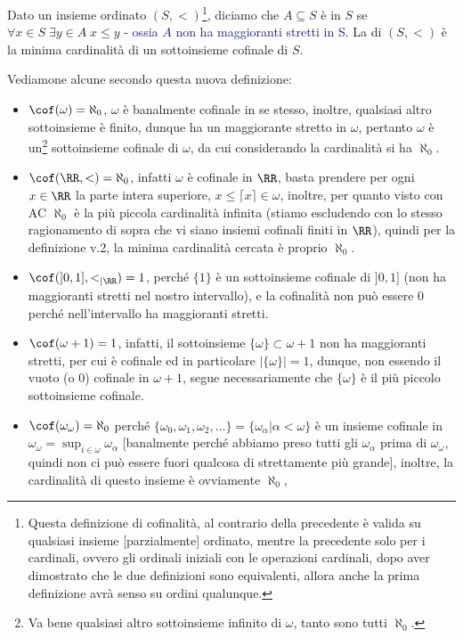 \documentclass[11pt]{scrartcl}
\begin{document}
\begin{definition}[Cofinalità - v.2]
	Dato un insieme ordinato $(S,<)$\footnote{Questa definizione di cofinalità, al contrario della precedente è valida su qualsiasi insieme [parzialmente] ordinato, mentre la
	precedente solo per i cardinali, ovvero gli ordinali iniziali con le operazioni cardinali, dopo aver dimostrato che le due definizioni sono equivalenti, allora anche la prima definizione
	avrà senso su ordini qualunque.}, diciamo che $A\subseteq S$ è  in $S$ se $\forall x \in S \; \exists y \in A \; x \leq y$ \textcolor{MidnightBlue}{- ossia $A$ non 
	ha maggioranti stretti in S}. La  di $(S,<)$ è la minima cardinalità di un sottoinsieme cofinale di $S$.
\end{definition}

\begin{example}
	Vediamone alcune secondo questa nuova definizione:
	\begin{itemize}
		\item $\cof(\omega) = \aleph_0$, $\omega$ è banalmente cofinale in se stesso, inoltre, qualsiasi altro sottoinsieme è finito, dunque ha un maggiorante stretto in $\omega$, pertanto $\omega$ è un\footnote{Va bene qualsiasi altro sottoinsieme infinito di $\omega$, tanto sono tutti $\aleph_0$.} sottoinsieme
		cofinale di $\omega$, da cui considerando la cardinalità si ha $\aleph_0$.
		\item $\cof(\RR,<) = \aleph_0$, infatti $\omega$ è cofinale in $\RR$, basta prendere per ogni $x \in \RR$ la parte intera superiore, $x \leq \lceil x \rceil \in \omega$, inoltre, per quanto visto con AC $\aleph_0$ è la più
		piccola cardinalità infinita (stiamo escludendo con lo stesso ragionamento di sopra che vi siano insiemi cofinali finiti in $\RR$), quindi per la definizione v.2, la minima cardinalità cercata è proprio $\aleph_0$.
		\item $\cof(]0,1],<_{|\RR}) = 1$, perché $\{1\}$ è un sottoinsieme cofinale di $]0,1]$ (non ha maggioranti stretti nel nostro intervallo), e la cofinalità non può essere 0 perché nell'intervallo ha maggioranti stretti.
		\item $\cof(\omega+1) = 1$, infatti, il sottoinsieme $\{\omega\} \subset \omega + 1$ non ha maggioranti stretti, per cui è cofinale ed in particolare $|\{\omega\}| = 1$, dunque, non essendo il vuoto (o 0) cofinale in $\omega + 1$, segue necessariamente che $\{\omega\}$ è il più piccolo sottoinsieme cofinale.
		\item $\cof(\omega_\omega) = \aleph_0$ perché $\{\omega_0,\omega_1,\omega_2,\ldots\} = \{\omega_\alpha | \alpha < \omega\}$ è un insieme cofinale in $\omega_\omega = \sup_{i \in \omega} \omega_\alpha$ [banalmente perché abbiamo preso tutti gli $\omega_\alpha$ prima di $\omega_\omega$, quindi non ci può essere fuori qualcosa di strettamente più grande], inoltre, la cardinalità di questo insieme è ovviamente $\aleph_0$,

\end{itemize}
\end{example}
\end{document}
